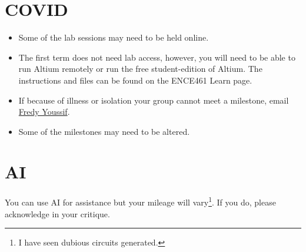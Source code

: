 \documentclass[11pt, a4paper]{article}
\makeatletter
\newcommand{\fredy}{\href{mailto:fredy.youssif@pg.canterbury.ac.nz}{Fredy Youssif}}
\makeatother
\begin{document}
\section{COVID}


\begin{itemize}
\item Some of the lab sessions may need to be held online.

\item The first term does not need lab access, however, you will need
  to be able to run Altium remotely or run the free student-edition of
  Altium.  The instructions and files can be found on the ENCE461
  Learn page.

\item If because of illness or isolation your group cannot meet a
  milestone, email \fredy.

\item Some of the milestones may need to be altered.

\end{itemize}


\section{AI}

You can use AI for assistance but your mileage will vary\footnote{I
  have seen dubious circuits generated.}.  If you do, please
acknowledge in your critique.
\end{document}

